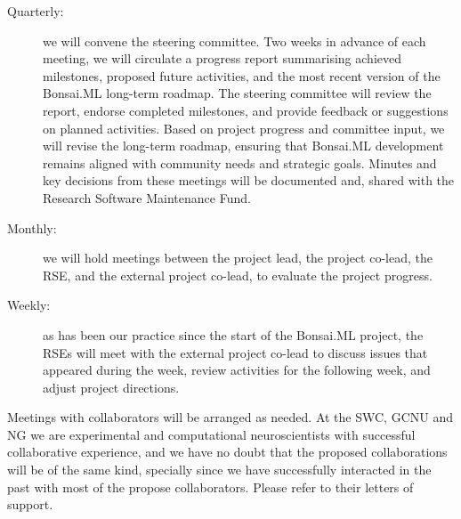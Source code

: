\begin{description}

    \item[Quarterly:] we will convene the steering committee. Two weeks in
        advance of each meeting, we will circulate a progress report
        summarising achieved milestones, proposed future activities, and the
        most recent version of the Bonsai.ML long-term roadmap.
        The steering committee will review the report, endorse completed
        milestones, and provide feedback or suggestions on planned activities.
        Based on project progress and committee input, we will revise the
        long-term roadmap, ensuring that Bonsai.ML development remains aligned
        with community needs and strategic goals.
        Minutes and key decisions from these meetings will be documented and,
        shared with the Research Software Maintenance Fund.

    \item[Monthly:] we will hold meetings between the project lead, the
        project co-lead, the RSE, and the external project co-lead, to evaluate
        the project progress.

    \item[Weekly:] as has been our practice since the start of the Bonsai.ML
        project, the RSEs will meet with the external project co-lead to
        discuss issues that appeared during the week, review activities for the
        following week, and adjust project directions.

\end{description}

Meetings with collaborators will be arranged as needed.
%
At the SWC, GCNU and NG we are experimental and computational neuroscientists
with successful collaborative experience, and we have no doubt that the
proposed collaborations will be of the same kind,
%
specially since we have successfully interacted in the past with most of the
propose collaborators.
%
Please refer to their letters of support.
